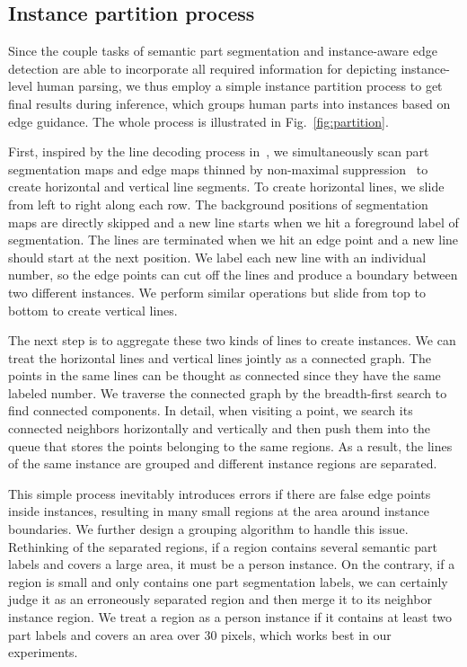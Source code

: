 \documentclass[runningheads]{llncs}
\begin{document}
\subsection{Instance partition process}

Since the couple tasks of semantic part segmentation and instance-aware edge detection are able to incorporate all required information for depicting instance-level human parsing, we thus employ a simple instance partition process to get final results during inference, which groups human parts into instances based on edge guidance. The whole process is illustrated in Fig.~\ref{fig:partition}.

First, inspired by the line decoding process in~\cite{Liu_2017_ICCV}, we simultaneously scan part segmentation maps and edge maps thinned by non-maximal suppression~\cite{xie2015holistically} to create horizontal and vertical line segments. To create horizontal lines, we slide from left to right along each row. The background positions of segmentation maps are directly skipped and a new line starts when we hit a foreground label of segmentation. The lines are terminated when we hit an edge point and a new line should start at the next position. 
We label each new line with an individual number, so the edge points can cut off the lines and produce a boundary between two different instances. We perform similar operations but slide from top to bottom to create vertical lines.

The next step is to aggregate these two kinds of lines to create instances. We can treat the horizontal lines and vertical lines jointly as a connected graph. The points in the same lines can be thought as connected since they have the same labeled number. We traverse the connected graph by the breadth-first search to find connected components. In detail, when visiting a point, we search its connected neighbors horizontally and vertically and then push them into the queue that stores the points belonging to the same regions. As a result, the lines of the same instance are grouped and different instance regions are separated.

This simple process inevitably introduces errors if there are false edge points inside instances, resulting in many small regions at the area around instance boundaries. We further design a grouping algorithm to handle this issue. Rethinking of the separated regions, if a region contains several semantic part labels and covers a large area, it must be a person instance. On the contrary, if a region is small and only contains one part segmentation labels, we can certainly judge it as an erroneously separated region and then merge it to its neighbor instance region. We treat a region as a person instance if it contains at least two part labels and covers an area over 30 pixels, which works best in our experiments. 
\end{document}
